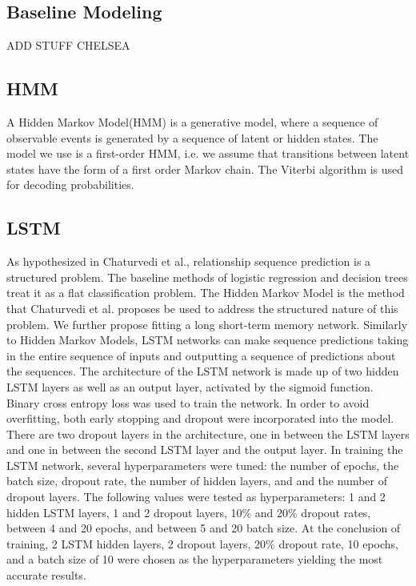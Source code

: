\documentclass[11pt,a4paper]{article}
\begin{document}
\subsection{Baseline Modeling}

ADD STUFF CHELSEA 


\subsection{HMM}
A Hidden Markov Model(HMM) is a generative model, where a sequence of observable events is generated by a sequence of latent or hidden states. The model we use is a first-order HMM, i.e. we assume that transitions between latent states have the form of a first order Markov chain. The Viterbi algorithm is used for decoding probabilities.

\subsection{LSTM}
As hypothesized in Chaturvedi et al., relationship sequence prediction is a structured problem. The baseline methods of logistic regression and decision trees treat it as a flat classification problem. The Hidden Markov Model is the method that Chaturvedi et al. proposes be used to address the structured nature of this problem. We further propose fitting a long short-term memory network. Similarly to Hidden Markov Models, LSTM networks can make sequence predictions taking in the entire sequence of inputs and outputting a sequence of predictions about the sequences. 
The architecture of the LSTM network is made up of two hidden LSTM layers as well as an output layer, activated by the sigmoid function. Binary cross entropy loss was used to train the network. In order to avoid overfitting, both early stopping and dropout were incorporated into the model. There are two dropout layers in the architecture, one in between the LSTM layers and one in between the second LSTM layer and the output layer.
In training the LSTM network, several hyperparameters were tuned: the number of epochs, the batch size, dropout rate, the number of hidden layers, and and the number of dropout layers. The following values were tested as hyperparameters: 1 and 2 hidden LSTM layers, 1 and 2 dropout layers, 10\% and 20\% dropout rates, between 4 and 20 epochs, and between 5 and 20 batch size. At the conclusion of training, 2 LSTM hidden layers, 2 dropout layers, 20\% dropout rate, 10 epochs, and a batch size of 10 were chosen as the hyperparameters yielding the most accurate results.
\end{document}
